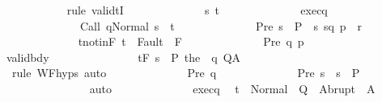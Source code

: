 \begin{isabellebody}
\ \ \ \ \ \ \ \ \ \ \isamarkupfalse%
\ {\isacharparenleft}rule\ validtI{\isacharparenright}\isanewline
\ \ \ \ \ \ \ \ \ \ \ \ \isamarkupfalse%
\ s\ t\isanewline
\ \ \ \ \ \ \ \ \ \ \ \ \isamarkupfalse%
\ exec{\isacharunderscore}q{\isacharcolon}\ \isanewline
\ \ \ \ \ \ \ \ \ \ \ \ \ \ {\isachardoublequoteopen}{\isasymGamma}{\isasymturnstile}{\isasymlangle}Call\ q{\isacharcomma}Normal\ s{\isasymrangle}\ {\isasymRightarrow}\ t{\isachardoublequoteclose}\isanewline
\ \ \ \ \ \ \ \ \ \ \ \ \isamarkupfalse%
\ Pre{\isacharcolon}\ {\isachardoublequoteopen}s\ {\isasymin}\ P{\isacharprime}\ {\isasyminter}\ {\isacharbraceleft}s{\isachardot}\ {\isacharparenleft}{\isacharparenleft}s{\isacharcomma}q{\isacharparenright}{\isacharcomma}\ {\isasymtau}{\isacharcomma}p{\isacharparenright}\ {\isasymin}\ r{\isacharbraceright}{\isachardoublequoteclose}\isanewline
\ \ \ \ \ \ \ \ \ \ \ \ \isamarkupfalse%
\ t{\isacharunderscore}notin{\isacharunderscore}F{\isacharcolon}\ {\isachardoublequoteopen}t\ {\isasymnotin}\ Fault\ {\isacharbackquote}\ F{\isachardoublequoteclose}\isanewline
\ \ \ \ \ \ \ \ \ \ \ \ \isamarkupfalse%
\ Pre\ q\ {\isasymtau}p\isanewline
\ \ \ \ \ \ \ \ \ \ \ \ \isamarkupfalse%
\ valid{\isacharunderscore}bdy{\isacharcolon}\ \isanewline
\ \ \ \ \ \ \ \ \ \ \ \ \ \ {\isachardoublequoteopen}{\isasymGamma}{\isasymTurnstile}\isactrlsub t\isactrlbsub {\isacharslash}F\isactrlesub \ {\isacharparenleft}{\isacharbraceleft}s{\isacharbraceright}\ {\isasyminter}\ P{\isacharprime}{\isacharparenright}\ the\ {\isacharparenleft}{\isasymGamma}\ q{\isacharparenright}\ Q{\isacharprime}{\isacharcomma}A{\isacharprime}{\isachardoublequoteclose}\isanewline
\ \ \ \ \ \ \ \ \ \ \ \ \ \ \isamarkupfalse%
\ {\isacharminus}\ {\isacharparenleft}rule\ WF{\isachardot}hyps{\isacharcomma}\ auto{\isacharparenright}\isanewline
\ \ \ \ \ \ \ \ \ \ \ \ \isamarkupfalse%
\ Pre\ q\isanewline
\ \ \ \ \ \ \ \ \ \ \ \ \isamarkupfalse%
\ Pre{\isacharprime}{\isacharcolon}\ {\isachardoublequoteopen}s\ {\isasymin}\ {\isacharbraceleft}s{\isacharbraceright}\ {\isasyminter}\ P{\isacharprime}{\isachardoublequoteclose}\isanewline
\ \ \ \ \ \ \ \ \ \ \ \ \ \ \isamarkupfalse%
\ auto\isanewline
\ \ \ \ \ \ \ \ \ \ \ \ \isamarkupfalse%
\ exec{\isacharunderscore}q\ \isamarkupfalse%
\ {\isachardoublequoteopen}t\ {\isasymin}\ Normal\ {\isacharbackquote}\ Q{\isacharprime}\ {\isasymunion}\ Abrupt\ {\isacharbackquote}\ A{\isacharprime}{\isachardoublequoteclose}\isanewline

\end{isabellebody}
